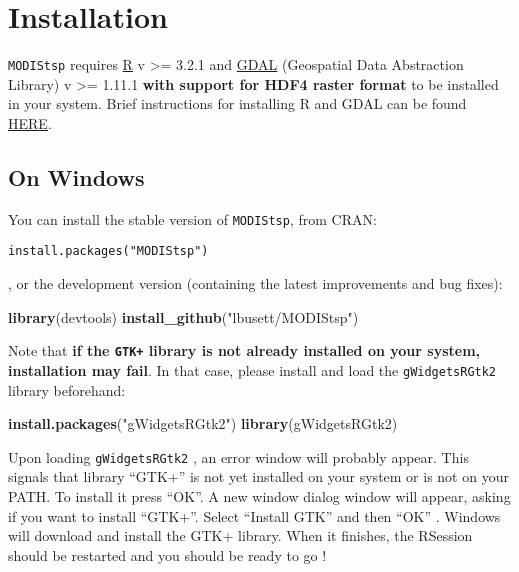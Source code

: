 \documentclass[]{article}
\newenvironment{Shaded}{\begin{snugshade}}{\end{snugshade}}
\newcommand{\KeywordTok}[1]{\textcolor[rgb]{0.13,0.29,0.53}{\textbf{#1}}}
\newcommand{\StringTok}[1]{\textcolor[rgb]{0.31,0.60,0.02}{#1}}
\newcommand{\NormalTok}[1]{#1}
\begin{document}
\section{Installation}\label{installation}

\texttt{MODIStsp} requires \href{https://cran.r-project.org}{R} v
\textgreater{}= 3.2.1 and \href{http://www.gdal.org}{GDAL} (Geospatial
Data Abstraction Library) v \textgreater{}= 1.11.1 \textbf{with support
for HDF4 raster format} to be installed in your system. Brief
instructions for installing R and GDAL can be found
\protect\hyperlink{installing-r-and-gdal}{HERE}.

\subsection{On Windows}\label{on-windows}

You can install the stable version of \texttt{MODIStsp}, from CRAN:

\texttt{install.packages("MODIStsp")}

, or the development version (containing the latest improvements and bug
fixes):

\begin{Shaded}
\begin{Highlighting}[]
\KeywordTok{library}\NormalTok{(devtools)}
\KeywordTok{install_github}\NormalTok{(}\StringTok{"lbusett/MODIStsp"}\NormalTok{)}
\end{Highlighting}
\end{Shaded}

Note that \textbf{if the \texttt{GTK+} library is not already installed
on your system, installation may fail}. In that case, please install and
load the \texttt{gWidgetsRGtk2} library beforehand:

\begin{Shaded}
\begin{Highlighting}[]
\KeywordTok{install.packages}\NormalTok{(}\StringTok{"gWidgetsRGtk2"}\NormalTok{)}
\KeywordTok{library}\NormalTok{(gWidgetsRGtk2)}
\end{Highlighting}
\end{Shaded}

Upon loading \texttt{gWidgetsRGtk2} , an error window will probably
appear. This signals that library ``GTK+'' is not yet installed on your
system or is not on your PATH. To install it press ``OK''. A new window
dialog window will appear, asking if you want to install ``GTK+''.
Select ``Install GTK'' and then ``OK'' . Windows will download and
install the GTK+ library. When it finishes, the RSession should be
restarted and you should be ready to go !
\end{document}
